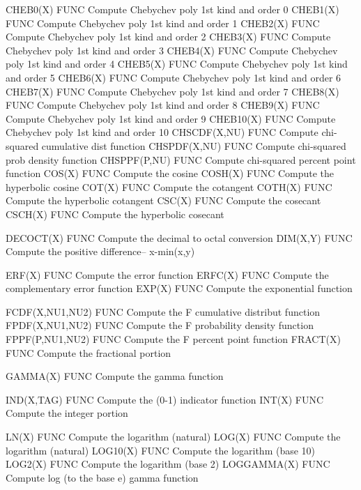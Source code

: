 CHEB0(X)                    FUNC  Compute Chebychev poly 1st kind and order 0
CHEB1(X)                    FUNC  Compute Chebychev poly 1st kind and order 1
CHEB2(X)                    FUNC  Compute Chebychev poly 1st kind and order 2
CHEB3(X)                    FUNC  Compute Chebychev poly 1st kind and order 3
CHEB4(X)                    FUNC  Compute Chebychev poly 1st kind and order 4
CHEB5(X)                    FUNC  Compute Chebychev poly 1st kind and order 5
CHEB6(X)                    FUNC  Compute Chebychev poly 1st kind and order 6
CHEB7(X)                    FUNC  Compute Chebychev poly 1st kind and order 7
CHEB8(X)                    FUNC  Compute Chebychev poly 1st kind and order 8
CHEB9(X)                    FUNC  Compute Chebychev poly 1st kind and order 9
CHEB10(X)                   FUNC  Compute Chebychev poly 1st kind and order 10
CHSCDF(X,NU)                FUNC  Compute chi-squared cumulative dist function
CHSPDF(X,NU)                FUNC  Compute chi-squared prob density function
CHSPPF(P,NU)                FUNC  Compute chi-squared percent point function
COS(X)                      FUNC  Compute the cosine
COSH(X)                     FUNC  Compute the hyperbolic cosine
COT(X)                      FUNC  Compute the cotangent
COTH(X)                     FUNC  Compute the hyperbolic cotangent
CSC(X)                      FUNC  Compute the cosecant
CSCH(X)                     FUNC  Compute the hyperbolic cosecant

DECOCT(X)                   FUNC  Compute the decimal to octal conversion
DIM(X,Y)                    FUNC  Compute the positive difference-- x-min(x,y)

ERF(X)                      FUNC  Compute the error function
ERFC(X)                     FUNC  Compute the complementary error function
EXP(X)                      FUNC  Compute the exponential function

FCDF(X,NU1,NU2)             FUNC  Compute the F cumulative distribut function
FPDF(X,NU1,NU2)             FUNC  Compute the F probability density function
FPPF(P,NU1,NU2)             FUNC  Compute the F percent point function
FRACT(X)                    FUNC  Compute the fractional portion

GAMMA(X)                    FUNC  Compute the gamma function

IND(X,TAG)                  FUNC  Compute the (0-1) indicator function
INT(X)                      FUNC  Compute the integer portion

LN(X)                       FUNC  Compute the logarithm (natural)
LOG(X)                      FUNC  Compute the logarithm (natural)
LOG10(X)                    FUNC  Compute the logarithm (base 10)
LOG2(X)                     FUNC  Compute the logarithm (base 2)
LOGGAMMA(X)                 FUNC  Compute log (to the base e) gamma function

